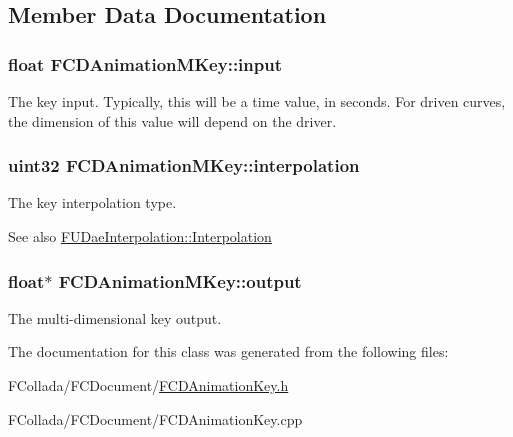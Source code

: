 \subsection{Member Data Documentation}
\hypertarget{classFCDAnimationMKey_a23e2a29dcce4b317979da21ec48f8e68}{
\subsubsection[{input}]{\setlength{\rightskip}{0pt plus 5cm}float {\bf FCDAnimationMKey::input}}}
\label{classFCDAnimationMKey_a23e2a29dcce4b317979da21ec48f8e68}
The key input. Typically, this will be a time value, in seconds. For driven curves, the dimension of this value will depend on the driver. \hypertarget{classFCDAnimationMKey_afde626bbddacb9897d80a6158f1a8e2a}{
\subsubsection[{interpolation}]{\setlength{\rightskip}{0pt plus 5cm}uint32 {\bf FCDAnimationMKey::interpolation}}}
\label{classFCDAnimationMKey_afde626bbddacb9897d80a6158f1a8e2a}
The key interpolation type. \begin{DoxySeeAlso}{See also}
\hyperlink{namespaceFUDaeInterpolation_a209a941c2fb6ece1325352968aa0374f}{FUDaeInterpolation::Interpolation} 
\end{DoxySeeAlso}
\hypertarget{classFCDAnimationMKey_a44bfaf4f29f3946f9a3ffe0db81828cb}{
\subsubsection[{output}]{\setlength{\rightskip}{0pt plus 5cm}float$\ast$ {\bf FCDAnimationMKey::output}}}
\label{classFCDAnimationMKey_a44bfaf4f29f3946f9a3ffe0db81828cb}
The multi-\/dimensional key output. 

The documentation for this class was generated from the following files:\begin{DoxyCompactItemize}
\item 
FCollada/FCDocument/\hyperlink{FCDAnimationKey_8h}{FCDAnimationKey.h}\item 
FCollada/FCDocument/FCDAnimationKey.cpp\end{DoxyCompactItemize}
